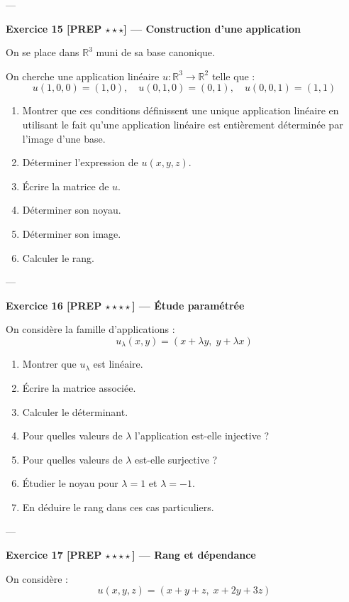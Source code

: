 \documentclass[11pt,a4paper]{article}
\begin{document}
---

\textbf{Exercice 15 [PREP $\star\star\star$] — Construction d’une application}

On se place dans $\mathbb{R}^3$ muni de sa base canonique.

On cherche une application linéaire $u : \mathbb{R}^3 \to \mathbb{R}^2$ telle que :
\[
u(1,0,0) = (1,0), \quad
u(0,1,0) = (0,1), \quad
u(0,0,1) = (1,1)
\]

\begin{enumerate}
\item Montrer que ces conditions définissent une unique application linéaire en utilisant le fait qu'une application linéaire est entièrement déterminée par l'image d'une base.
\item Déterminer l’expression de $u(x,y,z)$.
\item Écrire la matrice de $u$.
\item Déterminer son noyau.
\item Déterminer son image.
\item Calculer le rang.
\end{enumerate}

---

\textbf{Exercice 16 [PREP $\star\star\star\star$] — Étude paramétrée}

On considère la famille d’applications :
\[
u_\lambda(x,y) = (x + \lambda y,\; y + \lambda x)
\]

\begin{enumerate}
\item Montrer que $u_\lambda$ est linéaire.
\item Écrire la matrice associée.
\item Calculer le déterminant.
\item Pour quelles valeurs de $\lambda$ l’application est-elle injective ?
\item Pour quelles valeurs de $\lambda$ est-elle surjective ?
\item Étudier le noyau pour $\lambda = 1$ et $\lambda = -1$.
\item En déduire le rang dans ces cas particuliers.
\end{enumerate}

---

\textbf{Exercice 17 [PREP $\star\star\star\star$] — Rang et dépendance}

On considère :
\[
u(x,y,z) = (x+y+z,\; x+2y+3z)
\]
\end{document}
